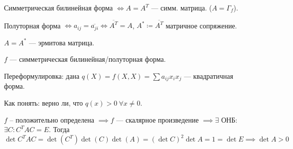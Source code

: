 Симметрическая билинейная форма  $\iff A = A^T$ --- симм. матрица. ($A = \Gamma_f$).

 Полуторная форма $\iff a_{ij} = \overline{a_{ji}} \iff \overline{A^T} = A$,  $A^* \coloneqq \overline{A^T}$ матричное сопряжение.

  $A = A^*$ --- эрмитова матрица.

 $f$ --- симметрическая билинейная/полуторная форма.

 Переформулировка: дана  $q(X) = f(X, X) = \sum a_{ij} x_i x_j$ --- квадратичная форма.

 Как понять: верно ли, что  $q(x) > 0 \ \forall x \neq 0$.

  $f$ -- положительно определена  $\implies f$ --- скалярное произведение  $\implies \exists $ ОНБ:  $\exists C\!: C^TAC = E$. Тогда $\det C^TAC = \det(C^T)\det(C)\det(A) = (\det C)^2 \det A = 1 = \det E \implies \det A > 0$

